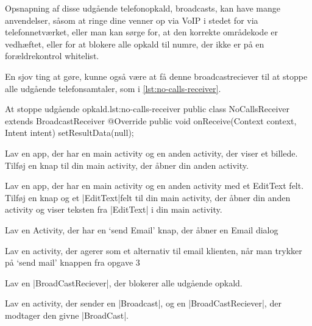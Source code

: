 Opsnapning af disse udgående telefonopkald, broadcasts, kan have mange anvendelser, såsom at ringe dine venner op via VoIP i stedet for via telefonnetværket, eller man kan sørge for, at den korrekte områdekode er vedhæftet, eller for at blokere alle opkald til numre, der ikke er på en forældrekontrol whitelist.

En sjov ting at gøre, kunne også være at få denne broadcastreciever til at stoppe alle udgående telefonsamtaler, som i \autoref{lst:no-calls-receiver}.

\begin{JavaCode}{At stoppe udgående opkald.}{lst:no-calls-receiver}
	public class NoCallsReceiver extends BroadcastReceiver {
		@Override
		public void onReceive(Context context, Intent intent) {
			setResultData(null);
		}
	}
\end{JavaCode}

\begin{exercise}
	Lav en app, der har en main activity og en anden activity, der viser et billede. Tilføj en knap til din main activity, der åbner din anden activity.
\end{exercise}

\begin{exercise}
	Lav en app, der har en main activity og en anden activity med et EditText felt. Tilføj en knap og et \JavaInline|EditText|felt til din main activity, der åbner din anden activity og viser teksten fra \JavaInline|EditText| i din main activity.
\end{exercise}

\begin{exercise}
	Lav en Activity, der har en ‘send Email’ knap, der åbner en Email dialog
\end{exercise}

\begin{exercise}
	Lav en activity, der agerer som et alternativ til email klienten, når man trykker på ‘send mail’ knappen fra opgave 3
\end{exercise}

\begin{exercise}
	Lav en \JavaInline|BroadCastReciever|, der blokerer alle udgående opkald.
\end{exercise}

\begin{exercise}
	Lav en activity, der sender en \JavaInline|Broadcast|, og en \JavaInline|BroadCastReciever|, der modtager den givne \JavaInline|BroadCast|.
\end{exercise}

